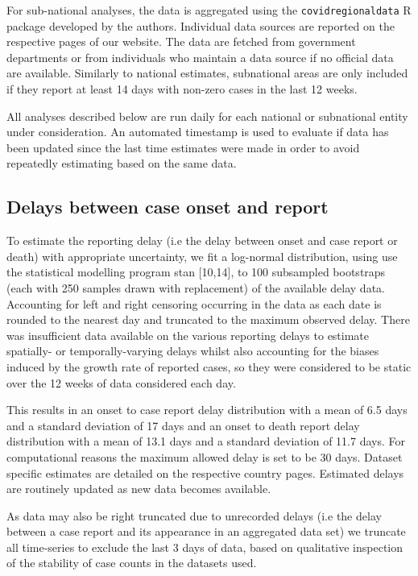 \documentclass[
]{article}
\begin{document}
For sub-national analyses, the data is aggregated using the
\texttt{covidregionaldata} R package developed by the authors.
Individual data sources are reported on the respective pages of our
website. The data are fetched from government departments or from
individuals who maintain a data source if no official data are
available. Similarly to national estimates, subnational areas are only
included if they report at least 14 days with non-zero cases in the last
12 weeks.

All analyses described below are run daily for each national or
subnational entity under consideration. An automated timestamp is used
to evaluate if data has been updated since the last time estimates were
made in order to avoid repeatedly estimating based on the same data.

\hypertarget{delays-between-case-onset-and-report}{%
\subsection{Delays between case onset and
report}\label{delays-between-case-onset-and-report}}

To estimate the reporting delay (i.e the delay between onset and case
report or death) with appropriate uncertainty, we fit a log-normal
distribution, using use the statistical modelling program stan
{[}10,14{]}, to 100 subsampled bootstraps (each with 250 samples drawn
with replacement) of the available delay data. Accounting for left and
right censoring occurring in the data as each date is rounded to the
nearest day and truncated to the maximum observed delay. There was
insufficient data available on the various reporting delays to estimate
spatially- or temporally-varying delays whilst also accounting for the
biases induced by the growth rate of reported cases, so they were
considered to be static over the 12 weeks of data considered each day.

This results in an onset to case report delay distribution with a mean
of 6.5 days and a standard deviation of 17 days and an onset to death
report delay distribution with a mean of 13.1 days and a standard
deviation of 11.7 days. For computational reasons the maximum allowed
delay is set to be 30 days. Dataset specific estimates are detailed on
the respective country pages. Estimated delays are routinely updated as
new data becomes available.

As data may also be right truncated due to unrecorded delays (i.e the
delay between a case report and its appearance in an aggregated data
set) we truncate all time-series to exclude the last 3 days of data,
based on qualitative inspection of the stability of case counts in the
datasets used.
\end{document}
